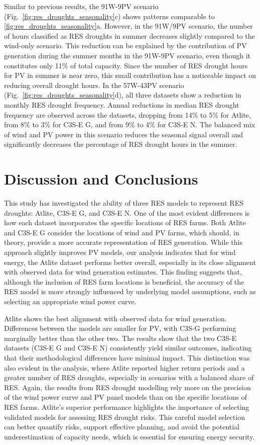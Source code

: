 \documentclass[a4paper, 11p1t]{article}
\begin{document}
Similar to previous results, the 91W-9PV scenario (Fig.~\ref{fig:res_droughts_seasonality}c) shows patterns comparable to \ref{fig:res_droughts_seasonality}a. However, in the 91W/9PV scenario, the number of hours classified as RES droughts in summer decreases slightly compared to the wind-only scenario. This reduction can be explained by the contribution of PV generation during the summer months in the 91W-9PV scenario, even though it constitutes only 11\% of total capacity. Since the number of RES drought hours for PV in summer is near zero, this small contribution has a noticeable impact on reducing overall drought hours. In the 57W-43PV scenario (Fig.~\ref{fig:res_droughts_seasonality}d), all three datasets show a reduction in monthly RES drought frequency. Annual reductions in median RES drought frequency are observed across the datasets, dropping from 14\% to 5\% for Atlite, from 8\% to 3\% for C3S-E G, and from 9\% to 4\% for C3S-E N. The balanced mix of wind and PV power in this scenario reduces the seasonal signal overall and significantly decreases the percentage of RES drought hours in the summer.

\newpage
\section{Discussion and Conclusions}
\label{sec:Conclusion}

This study has investigated the ability of three RES models to represent RES droughts: Atlite, C3S-E G, and C3S-E N. One of the most evident differences is how each dataset incorporates the specific locations of RES farms. Both Atlite and C3S-E G consider the locations of wind and PV farms, which should, in theory, provide a more accurate representation of RES generation. While this approach slightly improves PV models, our analysis indicates that for wind energy, the Atlite dataset performs better overall, especially in its close alignment with observed data for wind generation estimates. This finding suggests that, although the inclusion of RES farm locations is beneficial, the accuracy of the RES model is more strongly influenced by underlying model assumptions, such as selecting an appropriate wind power curve.

Atlite shows the best alignment with observed data for wind generation. Differences between the models are smaller for PV, with C3S-G performing marginally better than the other two. The results show that the two C3S-E datasets (C3S-E G and C3S-E N) consistently yield similar outcomes, indicating that their methodological differences have minimal impact. This distinction was also evident in the analysis, where Atlite reported higher return periods and a greater number of RES droughts, especially in scenarios with a balanced share of RES. Again, the results from RES drought modelling rely more on the precision of the wind power curve and PV panel models than on the specific locations of RES farms. Atlite’s superior performance highlights the importance of selecting validated models for assessing RES drought risks. This careful model selection can better quantify risks, support effective planning, and avoid the potential underestimation of capacity needs, which is essential for ensuring energy security.
\end{document}
